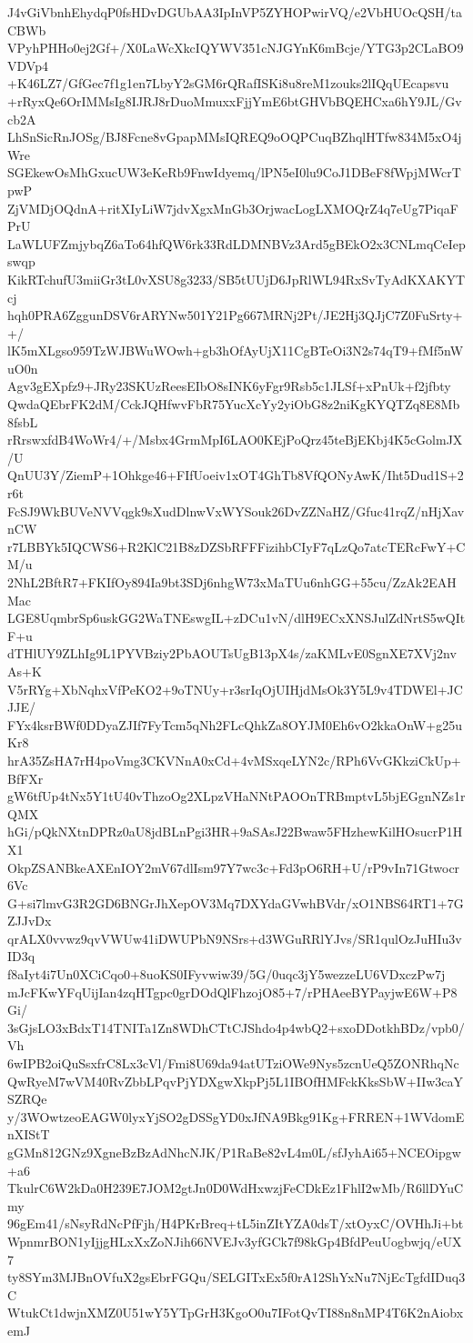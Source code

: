 J4vGiVbnhEhydqP0fsHDvDGUbAA3IpInVP5ZYHOPwirVQ/e2VbHUOcQSH/taCBWb
VPyhPHHo0ej2Gf+/X0LaWcXkcIQYWV351cNJGYnK6mBcje/YTG3p2CLaBO9VDVp4
+K46LZ7/GfGec7f1g1en7LbyY2sGM6rQRafISKi8u8reM1zouks2lIQqUEcapsvu
+rRyxQe6OrIMMsIg8IJRJ8rDuoMmuxxFjjYmE6btGHVbBQEHCxa6hY9JL/Gvcb2A
LhSnSicRnJOSg/BJ8Fcne8vGpapMMsIQREQ9oOQPCuqBZhqlHTfw834M5xO4jWre
SGEkewOsMhGxucUW3eKeRb9FnwIdyemq/lPN5eI0lu9CoJ1DBeF8fWpjMWcrTpwP
ZjVMDjOQdnA+ritXIyLiW7jdvXgxMnGb3OrjwacLogLXMOQrZ4q7eUg7PiqaFPrU
LaWLUFZmjybqZ6aTo64hfQW6rk33RdLDMNBVz3Ard5gBEkO2x3CNLmqCeIepswqp
KikRTchufU3miiGr3tL0vXSU8g3233/SB5tUUjD6JpRlWL94RxSvTyAdKXAKYTcj
hqh0PRA6ZggunDSV6rARYNw501Y21Pg667MRNj2Pt/JE2Hj3QJjC7Z0FuSrty++/
lK5mXLgso959TzWJBWuWOwh+gb3hOfAyUjX11CgBTeOi3N2s74qT9+fMf5nWuO0n
Agv3gEXpfz9+JRy23SKUzReesEIbO8sINK6yFgr9Rsb5c1JLSf+xPnUk+f2jfbty
QwdaQEbrFK2dM/CckJQHfwvFbR75YucXcYy2yiObG8z2niKgKYQTZq8E8Mb8fsbL
rRrswxfdB4WoWr4/+/Msbx4GrmMpI6LAO0KEjPoQrz45teBjEKbj4K5cGolmJX/U
QnUU3Y/ZiemP+1Ohkge46+FIfUoeiv1xOT4GhTb8VfQONyAwK/Iht5Dud1S+2r6t
FcSJ9WkBUVeNVVqgk9sXudDlnwVxWYSouk26DvZZNaHZ/Gfuc41rqZ/nHjXavnCW
r7LBBYk5IQCWS6+R2KlC21B8zDZSbRFFFizihbCIyF7qLzQo7atcTERcFwY+CM/u
2NhL2BftR7+FKIfOy894Ia9bt3SDj6nhgW73xMaTUu6nhGG+55cu/ZzAk2EAHMac
LGE8UqmbrSp6uskGG2WaTNEswgIL+zDCu1vN/dlH9ECxXNSJulZdNrtS5wQItF+u
dTHlUY9ZLhIg9L1PYVBziy2PbAOUTsUgB13pX4s/zaKMLvE0SgnXE7XVj2nvAs+K
V5rRYg+XbNqhxVfPeKO2+9oTNUy+r3srIqOjUIHjdMsOk3Y5L9v4TDWEl+JCJJE/
FYx4ksrBWf0DDyaZJIf7FyTcm5qNh2FLcQhkZa8OYJM0Eh6vO2kkaOnW+g25uKr8
hrA35ZsHA7rH4poVmg3CKVNnA0xCd+4vMSxqeLYN2c/RPh6VvGKkziCkUp+BfFXr
gW6tfUp4tNx5Y1tU40vThzoOg2XLpzVHaNNtPAOOnTRBmptvL5bjEGgnNZs1rQMX
hGi/pQkNXtnDPRz0aU8jdBLnPgi3HR+9aSAsJ22Bwaw5FHzhewKilHOsucrP1HX1
OkpZSANBkeAXEnIOY2mV67dlIsm97Y7wc3c+Fd3pO6RH+U/rP9vIn71Gtwocr6Vc
G+si7lmvG3R2GD6BNGrJhXepOV3Mq7DXYdaGVwhBVdr/xO1NBS64RT1+7GZJJvDx
qrALX0vvwz9qvVWUw41iDWUPbN9NSrs+d3WGuRRlYJvs/SR1qulOzJuHIu3vID3q
f8aIyt4i7Un0XCiCqo0+8uoKS0IFyvwiw39/5G/0uqc3jY5wezzeLU6VDxczPw7j
mJcFKwYFqUijIan4zqHTgpc0grDOdQlFhzojO85+7/rPHAeeBYPayjwE6W+P8Gi/
3sGjsLO3xBdxT14TNITa1Zn8WDhCTtCJShdo4p4wbQ2+sxoDDotkhBDz/vpb0/Vh
6wIPB2oiQuSsxfrC8Lx3cVl/Fmi8U69da94atUTziOWe9Nys5zcnUeQ5ZONRhqNc
QwRyeM7wVM40RvZbbLPqvPjYDXgwXkpPj5L1IBOfHMFckKksSbW+IIw3caYSZRQe
y/3WOwtzeoEAGW0lyxYjSO2gDSSgYD0xJfNA9Bkg91Kg+FRREN+1WVdomEnXIStT
gGMn812GNz9XgneBzBzAdNhcNJK/P1RaBe82vL4m0L/sfJyhAi65+NCEOipgw+a6
TkulrC6W2kDa0H239E7JOM2gtJn0D0WdHxwzjFeCDkEz1FhlI2wMb/R6llDYuCmy
96gEm41/sNsyRdNcPfFjh/H4PKrBreq+tL5inZItYZA0dsT/xtOyxC/OVHhJi+bt
WpnmrBON1yIjjgHLxXxZoNJih66NVEJv3yfGCk7f98kGp4BfdPeuUogbwjq/eUX7
ty8SYm3MJBnOVfuX2gsEbrFGQu/SELGITxEx5f0rA12ShYxNu7NjEcTgfdIDuq3C
WtukCt1dwjnXMZ0U51wY5YTpGrH3KgoO0u7IFotQvTI88n8nMP4T6K2nAiobxemJ
